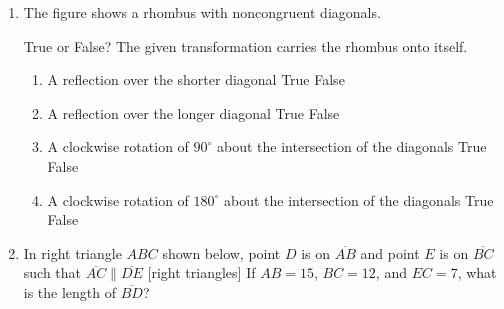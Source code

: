 \documentclass[12pt, twoside]{article}
\begin{document}
\begin{enumerate}
    \item The figure shows a rhombus with noncongruent diagonals.

    True or False? The given transformation carries the rhombus onto itself.
      \begin{enumerate}
        \item A reflection over the shorter diagonal \hfill True \quad False
        \item A reflection over the longer diagonal \hfill True \quad False
        \item A clockwise rotation of $90^\circ$ about the intersection of the diagonals \hfill True \quad False
        \item A clockwise rotation of $180^\circ$ about the intersection of the diagonals \hfill True \quad False
      \end{enumerate}

    \item In right triangle $ABC$ shown below, point $D$ is on $\overline{AB}$ and point $E$ is on $\overline{BC}$ such that $\overline{AC} \parallel \overline{DE}$
    [right triangles]
    If $AB=15$, $BC=12$, and $EC=7$, what is the length of $\overline{BD}$?


  \end{enumerate}

  
\end{document}
